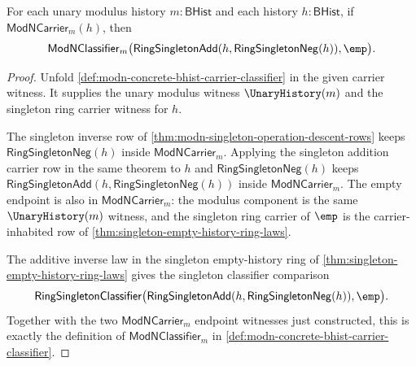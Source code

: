 \begin{theorem}
\label{thm:modn-singleton-add-neg-empty-classifier}
For each unary modulus history $m:\mathsf{BHist}$ and each history
$h:\mathsf{BHist}$, if $\mathsf{ModNCarrier}_m(h)$, then
$$
\mathsf{ModNClassifier}_m\bigl(\mathsf{RingSingletonAdd}(h,\mathsf{RingSingletonNeg}(h)),\emp\bigr).
$$
\end{theorem}
\begin{proof}
Unfold \autoref{def:modn-concrete-bhist-carrier-classifier} in the given
carrier witness. It supplies the unary modulus witness $\UnaryHistory(m)$
and the singleton ring carrier witness for $h$.

The singleton inverse row of \autoref{thm:modn-singleton-operation-descent-rows}
keeps $\mathsf{RingSingletonNeg}(h)$ inside $\mathsf{ModNCarrier}_m$. Applying
the singleton addition carrier row in the same theorem to $h$ and
$\mathsf{RingSingletonNeg}(h)$ keeps
$\mathsf{RingSingletonAdd}(h,\mathsf{RingSingletonNeg}(h))$ inside
$\mathsf{ModNCarrier}_m$. The empty endpoint is also in
$\mathsf{ModNCarrier}_m$: the modulus component is the same
$\UnaryHistory(m)$ witness, and the singleton ring carrier of $\emp$ is
the carrier-inhabited row of \autoref{thm:singleton-empty-history-ring-laws}.

The additive inverse law in the singleton empty-history ring of
\autoref{thm:singleton-empty-history-ring-laws} gives the singleton classifier
comparison
$$
\mathsf{RingSingletonClassifier}\bigl(
\mathsf{RingSingletonAdd}(h,\mathsf{RingSingletonNeg}(h)),\emp\bigr).
$$
Together with the two $\mathsf{ModNCarrier}_m$ endpoint witnesses just
constructed, this is exactly the definition of
$\mathsf{ModNClassifier}_m$ in \autoref{def:modn-concrete-bhist-carrier-classifier}.
\end{proof}
